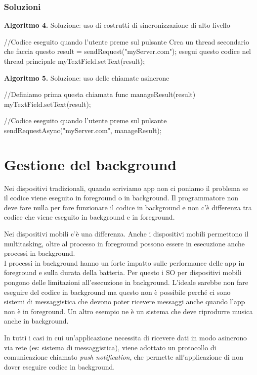 \subsubsection{Soluzioni}
\textbf{Algoritmo 4. }Soluzione: uso di costrutti di sincronizzazione di alto livello
\begin{Java}
    //Codice eseguito quando l'utente preme sul pulsante
    Crea un thread secondario che faccia questo {
        result = sendRequest("myServer.com");
        esegui questo codice nel thread principale {
            myTextField.setText(result);
        }
    }
\end{Java}
\textbf{Algoritmo 5. }Soluzione: uso delle chiamate asincrone
\begin{Java}
    //Definiamo prima questa chiamata
    func manageResult(result) {
        myTextField.setText(result);
    }
\end{Java}
\begin{Java}
    //Codice eseguito quando l'utente preme sul pulsante
    sendRequestAsync("myServer.com", manageResult);
\end{Java}

\section{Gestione del background}
Nei dispositivi tradizionali, quando scriviamo app non ci poniamo il problema se il codice viene eseguito in foreground o in background.
Il programmatore non deve fare nulla per fare funzionare il codice in background e non c'è differenza tra codice che viene eseguito in background e in foreground.

Nei dispositivi mobili c'è una differenza. Anche i dispositivi mobili permettono il multitasking, oltre al processo in foreground possono essere in esecuzione anche processi in background. 
\\ I processi in background hanno un forte impatto sulle performance delle app in foreground e sulla durata della batteria. Per questo i SO per dispositivi mobili pongono delle limitazioni all'esecuzione in background. 
L'ideale sarebbe non fare eseguire del codice in background ma questo non è possibile perché ci sono sistemi di messaggistica che devono poter ricevere messaggi anche quando l'app non è in foreground.
Un altro esempio ne è un sistema che deve riprodurre musica anche in background. 

In tutti i casi in cui un’applicazione necessita di ricevere dati in modo asincrono via rete (es: sistema di messaggistica), viene adottato un protocollo di comunicazione chiamato \textit{push notification}, che permette all'applicazione di non dover eseguire codice in background.

